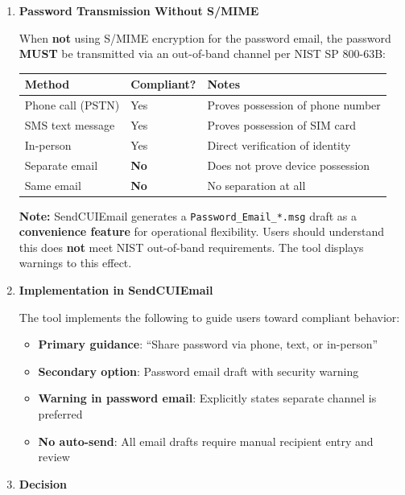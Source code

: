 \documentclass[11pt,letterpaper]{article}
\newcommand{\dmsection}[1]{\item \textbf{#1}\par}
\begin{document}
\begin{enumerate}
\dmsection{Password Transmission Without S/MIME}

When \textbf{not} using S/MIME encryption for the password email, the password \textbf{MUST} be transmitted via an out-of-band channel per NIST SP 800-63B:

\begin{tabularx}{\textwidth}{|l|l|X|}
\hline
\textbf{Method} & \textbf{Compliant?} & \textbf{Notes} \\
\hline
Phone call (PSTN) & Yes & Proves possession of phone number \\
\hline
SMS text message & Yes & Proves possession of SIM card \\
\hline
In-person & Yes & Direct verification of identity \\
\hline
Separate email & \textbf{No} & Does not prove device possession \\
\hline
Same email & \textbf{No} & No separation at all \\
\hline
\end{tabularx}

\vspace{12pt}

\textbf{Note:} SendCUIEmail generates a \texttt{Password\_Email\_*.msg} draft as a \textbf{convenience feature} for operational flexibility. Users should understand this does \textbf{not} meet NIST out-of-band requirements. The tool displays warnings to this effect.

\dmsection{Implementation in SendCUIEmail}

The tool implements the following to guide users toward compliant behavior:

\begin{itemize}
    \item \textbf{Primary guidance}: ``Share password via phone, text, or in-person''
    \item \textbf{Secondary option}: Password email draft with security warning
    \item \textbf{Warning in password email}: Explicitly states separate channel is preferred
    \item \textbf{No auto-send}: All email drafts require manual recipient entry and review
\end{itemize}

\dmsection{Decision}


\end{enumerate}
\end{document}
